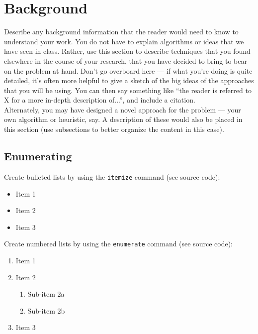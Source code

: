 
\section{Background}
\label{sec:background}

Describe any background information that the reader would need to know
to understand your work. You do not have to explain algorithms or
ideas that we have seen in class. Rather, use this section to describe
techniques that you found elsewhere in the course of your research,
that you have decided to bring to bear on the problem at hand. Don't
go overboard here --- if what you're doing is quite detailed, it's
often more helpful to give a sketch of the big ideas of the approaches
that you will be using. You can then say something like ``the reader
is referred to X for a more in-depth description of...'', and include
a citation.\\

Alternately, you may have designed a novel approach for the problem
--- your own algorithm or heuristic, say. A description of these would
also be placed in this section (use subsections to better organize the
content in this case).

\subsection{Enumerating}
\label{subsec:enum}

Create bulleted lists by using the \texttt{itemize} command (see source code):
\begin{itemize}
  \item Item 1
  \item Item 2
  \item Item 3
\end{itemize}
Create numbered lists by using the \texttt{enumerate} command (see source code):
\begin{enumerate}
  \item Item 1
  \item Item 2
    \begin{enumerate}
    \item Sub-item 2a
    \item Sub-item 2b
    \end{enumerate}
  \item Item 3
\end{enumerate}

